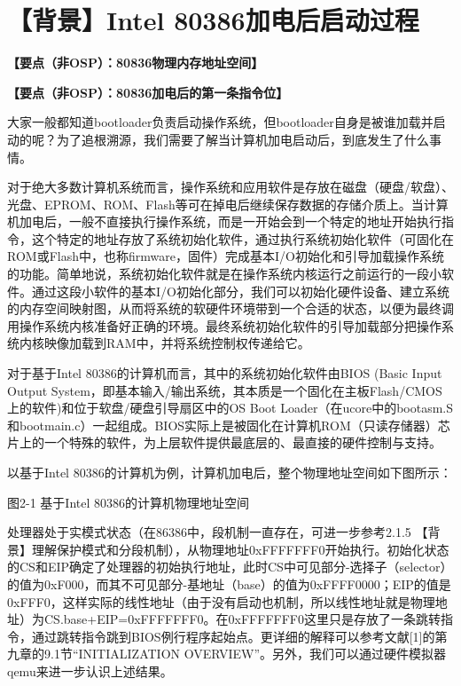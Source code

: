 \section{【背景】Intel
80386加电后启动过程}\label{ux80ccux666fintel-80386ux52a0ux7535ux540eux542fux52a8ux8fc7ux7a0b}

\textbf{【要点（非OSP）：80836物理内存地址空间】}

\textbf{【要点（非OSP）：80836加电后的第一条指令位】}

大家一般都知道bootloader负责启动操作系统，但bootloader自身是被谁加载并启动的呢？为了追根溯源，我们需要了解当计算机加电启动后，到底发生了什么事情。

对于绝大多数计算机系统而言，操作系统和应用软件是存放在磁盘（硬盘/软盘）、光盘、EPROM、ROM、Flash等可在掉电后继续保存数据的存储介质上。当计算机加电后，一般不直接执行操作系统，而是一开始会到一个特定的地址开始执行指令，这个特定的地址存放了系统初始化软件，通过执行系统初始化软件（可固化在ROM或Flash中，也称firmware，固件）完成基本I/O初始化和引导加载操作系统的功能。简单地说，系统初始化软件就是在操作系统内核运行之前运行的一段小软件。通过这段小软件的基本I/O初始化部分，我们可以初始化硬件设备、建立系统的内存空间映射图，从而将系统的软硬件环境带到一个合适的状态，以便为最终调用操作系统内核准备好正确的环境。最终系统初始化软件的引导加载部分把操作系统内核映像加载到RAM中，并将系统控制权传递给它。

对于基于Intel 80386的计算机而言，其中的系统初始化软件由BIOS (Basic Input
Output
System，即基本输入/输出系统，其本质是一个固化在主板Flash/CMOS上的软件)和位于软盘/硬盘引导扇区中的OS
Boot
Loader（在ucore中的bootasm.S和bootmain.c）一起组成。BIOS实际上是被固化在计算机ROM（只读存储器）芯片上的一个特殊的软件，为上层软件提供最底层的、最直接的硬件控制与支持。

以基于Intel
80386的计算机为例，计算机加电后，整个物理地址空间如下图所示：


图2-1 基于Intel 80386的计算机物理地址空间

处理器处于实模式状态（在86386中，段机制一直存在，可进一步参考2.1.5
【背景】理解保护模式和分段机制），从物理地址0xFFFFFFF0开始执行。初始化状态的CS和EIP确定了处理器的初始执行地址，此时CS中可见部分-选择子（selector）的值为0xF000，而其不可见部分-基地址（base）的值为0xFFFF0000；EIP的值是0xFFF0，这样实际的线性地址（由于没有启动也机制，所以线性地址就是物理地址）为CS.base+EIP=0xFFFFFFF0。在0xFFFFFFF0这里只是存放了一条跳转指令，通过跳转指令跳到BIOS例行程序起始点。更详细的解释可以参考文献{[}1{]}的第九章的9.1节``INITIALIZATION
OVERVIEW''。另外，我们可以通过硬件模拟器qemu来进一步认识上述结果。

